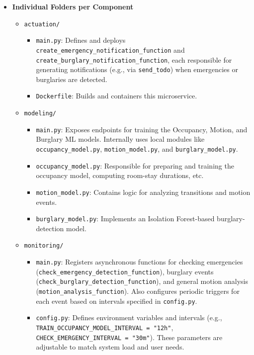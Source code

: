 \documentclass[A4,10pt]{article}
\begin{document}
\begin{itemize}
  \item \textbf{Individual Folders per Component}
  \begin{itemize}
    \item \texttt{actuation/}
      \begin{itemize}
        \item \texttt{main.py}: Defines and deploys \texttt{create\_emergency\_notification\_function}
          and \texttt{create\_burglary\_notification\_function}, each responsible for generating 
          notifications (e.g., via \texttt{send\_todo}) when emergencies or burglaries are detected.
        \item \texttt{Dockerfile}: Builds and containers this microservice.
      \end{itemize}

    \item \texttt{modeling/}
      \begin{itemize}
        \item \texttt{main.py}: Exposes endpoints for training the Occupancy, Motion, 
          and Burglary ML models. Internally uses local modules like \texttt{occupancy\_model.py},
          \texttt{motion\_model.py}, and \texttt{burglary\_model.py}.
        \item \texttt{occupancy\_model.py}: Responsible for preparing and training the occupancy model, 
          computing room-stay durations, etc.
        \item \texttt{motion\_model.py}: Contains logic for analyzing transitions and motion events. 
        \item \texttt{burglary\_model.py}: Implements an Isolation Forest-based burglary-detection model.
      \end{itemize}

    \item \texttt{monitoring/}
      \begin{itemize}
        \item \texttt{main.py}: Registers asynchronous functions for checking emergencies 
          (\texttt{check\_emergency\_detection\_function}), burglary events 
          (\texttt{check\_burglary\_detection\_function}), and general motion analysis 
          (\texttt{motion\_analysis\_function}). Also configures periodic triggers for each event 
          based on intervals specified in \texttt{config.py}.
        \item \texttt{config.py}: Defines environment variables and intervals 
          (e.g., \texttt{TRAIN\_OCCUPANCY\_MODEL\_INTERVAL = "12h"}, 
          \texttt{CHECK\_EMERGENCY\_INTERVAL = "30m"}). These parameters are adjustable 
          to match system load and user needs.
      \end{itemize}
  \end{itemize}


\end{itemize}
\end{document}
